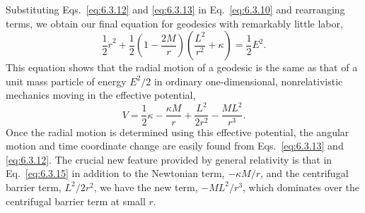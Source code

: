 Substituting Eqs.~\eqref{eq:6.3.12} and \eqref{eq:6.3.13} in
Eq.~\eqref{eq:6.3.10} and rearranging terms, we obtain our final equation for
geodesics with remarkably little labor,
\begin{equation}
  \frac12\dot r^2+\frac12\left(1-\frac{2M}{r}\right)
  \left(\frac{L^2}{r^2}+\kappa\right)=\frac12E^2.
  \tag{6.3.14}\label{eq:6.3.14}
\end{equation}
This equation shows that the radial motion of a geodesic is the same as that of a
unit mass particle of energy \(E^2/2\) in ordinary one-dimensional,
nonrelativistic mechanics moving in the effective potential,
\begin{equation}
  V=\frac12\kappa-\frac{\kappa M}{r}+\frac{L^2}{2r^2}-\frac{ML^2}{r^3}.
  \tag{6.3.15}\label{eq:6.3.15}
\end{equation}
Once the radial motion is determined using this effective potential, the angular
motion and time coordinate change are easily found from Eqs.~\eqref{eq:6.3.13}
and \eqref{eq:6.3.12}. The crucial new feature provided by general relativity is
that in Eq.~\eqref{eq:6.3.15} in addition to the Newtonian term,
\(-\kappa M/r\), and the centrifugal barrier term, \(L^2/2r^2\), we have the new
term, \(-ML^2/r^3\), which dominates over the centrifugal barrier term at small
\(r\).

